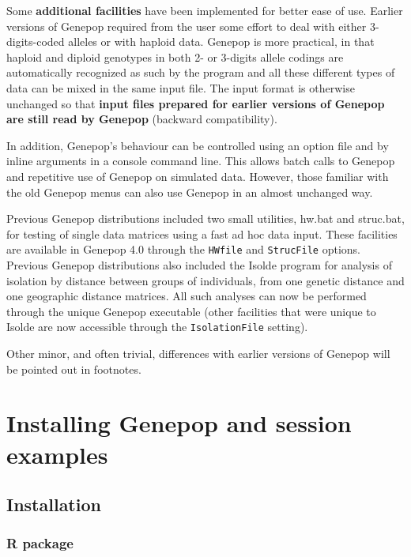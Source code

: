 \documentclass[12pt,]{book}
\theoremstyle{definition}
\theoremstyle{definition}
\theoremstyle{definition}
\theoremstyle{remark}
\begin{document}
Some \textbf{additional facilities} have been implemented for better
ease of use. Earlier versions of Genepop required from the user some
effort to deal with either 3-digits-coded 
alleles or with haploid data. Genepop is more practical, in that haploid
 and diploid genotypes in both 2- or 3-digits allele
codings are automatically recognized as such by the program and all
these different types of data can be mixed in the same input file. The
input format is otherwise unchanged so that \textbf{input files prepared
for earlier versions of Genepop are still read by Genepop} (backward
compatibility).

In addition, Genepop's behaviour can be controlled using an option file
and by inline arguments in a console command line. This allows batch
calls to Genepop and repetitive use of Genepop on simulated data.
However, those familiar with the old Genepop menus can also use Genepop
in an almost unchanged way.

Previous Genepop distributions included two small utilities, hw.bat
 and struc.bat,  for testing of
single data matrices using a fast ad hoc data input. These facilities
are available in Genepop 4.0 through the \texttt{HWfile}
 and \texttt{StrucFile} options.
 Previous Genepop distributions also included
the Isolde  program for analysis of isolation by
distance between groups of individuals, from one genetic distance and
one geographic distance matrices. All such analyses can now be performed
through the unique Genepop executable (other facilities that were unique
to Isolde are now accessible through the \texttt{IsolationFile}
setting).

Other minor, and often trivial, differences with earlier versions of
Genepop will be pointed out in footnotes.

\chapter{Installing Genepop and session
examples}\label{installing-genepop-and-session-examples}

\section{Installation}\label{installation}

\subsection{R package}\label{r-package}
\end{document}
